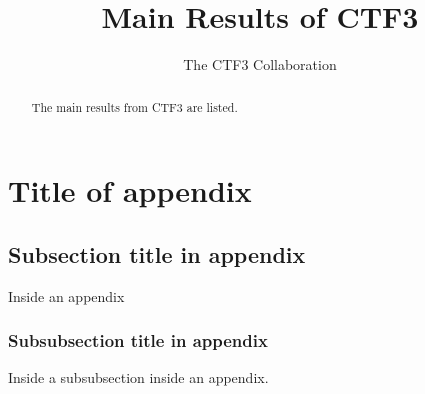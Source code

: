 \documentclass[biblatex]{cernrep}
\begin{document}
\title{Main Results of CTF3}

\author{The CTF3 Collaboration}


\begin{abstract}
The main results from CTF3 are listed.
\end{abstract}


\maketitle






\appendix
\section{Title of appendix}
\label{sec:app}

\subsection{Subsection title in appendix}
Inside an appendix
\subsubsection{Subsubsection title in appendix}
Inside a subsubsection inside an appendix.

\end{document}

